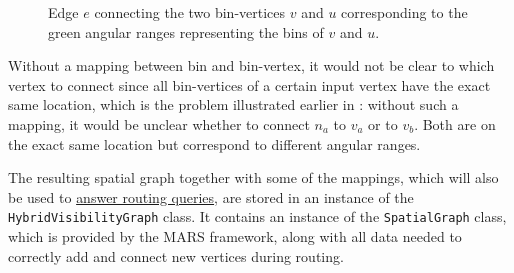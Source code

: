 		\begin{figure}[h]
			\begin{figcenter}
			\end{figcenter}
			\caption{Edge $e$ connecting the two bin-vertices $v$ and $u$ corresponding to the green angular ranges representing the bins of $v$ and $u$.}
			\label{fig:bin-vertex-connection}
		\end{figure}
		
		Without a mapping between bin and bin-vertex, it would not be clear to which vertex to connect since all bin-vertices of a certain input vertex have the exact same location, which is the problem illustrated earlier in :
		without such a mapping, it would be unclear whether to connect $n_a$ to $v_a$ or to $v_b$.
		Both are on the exact same location but correspond to different angular ranges.
		
		The resulting spatial graph together with some of the mappings, which will also be used to \hyperref[sec:answering-queries]{answer routing queries}, are stored in an instance of the \texttt{HybridVisibilityGraph} class.
		It contains an instance of the \texttt{SpatialGraph} class, which is provided by the MARS framework, along with all data needed to correctly add and connect new vertices during routing.
		
